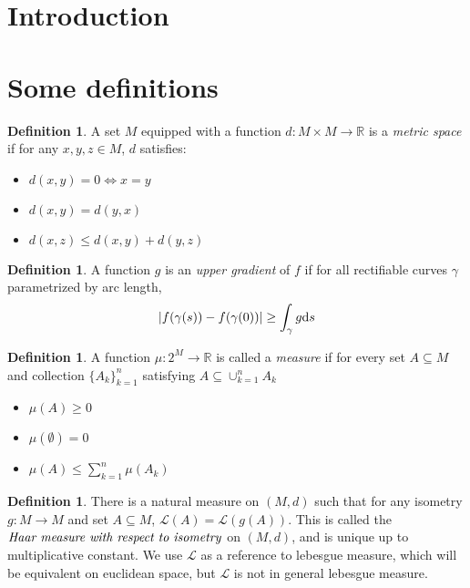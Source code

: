 \documentclass{article}
\theoremstyle{plain}
\theoremstyle{definition}
\newtheorem{defn}[thm]{Definition}
\renewcommand{\(}{\left(}
\renewcommand{\)}{\right)}
\newcommand{\R}{\mathbb R}
\renewcommand{\d}{\textrm d}
\begin{document}
\section{Introduction}
\section{Some definitions}
\begin{defn}\label{def:M}
  A set $M$ equipped with a function $d : M \times M \rightarrow \R$ is a \emph{metric space} if for any $x,y,z \in M$, $d$ satisfies:
  \begin{itemize}
  \item $d(x,y) = 0 \Leftrightarrow x = y$
  \item $d(x,y) = d(y,x)$
  \item $d(x,z) \leq d(x,y) + d(y,z)$
  \end{itemize}
\end{defn}

\begin{defn}\label{def:upper-gradient}
  A function $g$ is an \emph{upper gradient} of $f$ if for all rectifiable curves $\gamma$ parametrized by arc length,
  $$\left\vert f(\gamma(s)) - f(\gamma(0)) \right\vert \geq \int_\gamma g\d s $$
\end{defn}

\begin{defn}
  A function $\mu : 2^{M} \rightarrow \R$ is called a \emph{measure} if for every set $A \subseteq M$ and collection $\{A_k\}_{k=1}^{n}$ satisfying $A \subseteq \cup_{k=1}^n A_k$
  \begin{itemize}
  \item $\mu(A) \geq 0$
  \item $\mu(\emptyset) = 0$
  \item $\mu(A) \leq \sum_{k = 1}^n \mu(A_k)$
  \end{itemize}
\end{defn}

\begin{defn}
  There is a natural measure on $(M,d)$ such that for any isometry $g : M \rightarrow M$ and set $A \subseteq M$, $\mathcal L(A) = \mathcal L(g(A))$.  This is called the $\emph{Haar measure with respect to isometry}$ on $(M,d)$, and is unique up to multiplicative constant. We use $\mathcal L$ as a reference to lebesgue measure, which will be equivalent on euclidean space, but $\mathcal L$ is not in general lebesgue measure.
\end{defn}
\end{document}
